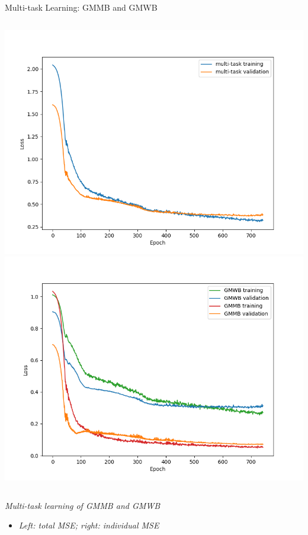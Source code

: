 \documentclass[9pt,handout]{beamer}
\begin{document}
    \begin{frame}{Multi-task Learning: GMMB and GMWB}
    \begin{columns}
    \includegraphics[height=0.8\textheight]{../project3/figures/figure5a.png}
    \includegraphics[height=0.8\textheight]{../project3/figures/figure5b.png}
    \end{columns}
    
    \textit{Multi-task learning of GMMB and GMWB}
    \begin{itemize}
        \item \textit{Left: total MSE; right: individual MSE}
    \end{itemize}
    \end{frame}
    
\end{document}
